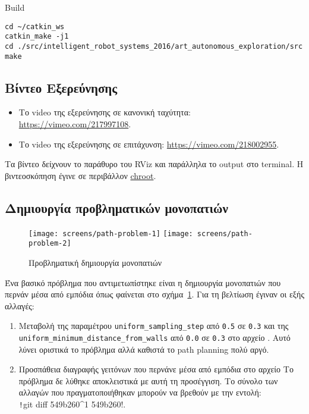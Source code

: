 \begin{code}
\caption{Build}
\begin{verbatim}
cd ~/catkin_ws
catkin_make -j1
cd ./src/intelligent_robot_systems_2016/art_autonomous_exploration/src
make
\end{verbatim}
\end{code}

\subsection{Βίντεο Εξερεύνησης}
\begin{itemize}
    \item Το video της εξερεύνησης σε κανονική ταχύτητα:
          \url{https://vimeo.com/217997108}.
    \item Το video της εξερεύνησης σε επιτάχυνση:
          \url{https://vimeo.com/218002955}.
\end{itemize}
Τα βίντεο δείχνουν το παράθυρο του RViz και παράλληλα το output στο terminal.
Η βιντεοσκόπηση έγινε σε περιβάλλον \hyperref[seq:chroot]{chroot}.

\subsection{Δημιουργία προβληματικών μονοπατιών}\label{section:uniform-sampling}
\begin{figure}[htb]
    \centering
    \texttt{[image: screens/path-problem-1]}
    \texttt{[image: screens/path-problem-2]}
    \caption{Προβληματική δημιουργία μονοπατιών}\label{fig:path-problem}
\end{figure}

Ένα βασικό πρόβλημα που αντιμετωπίστηκε είναι η δημιουργία μονοπατιών που περνάν μέσα από εμπόδια όπως φαίνεται στο σχήμα~\ref{fig:path-problem}.
Για τη βελτίωση έγιναν οι εξής αλλαγές:
\begin{enumerate}
    \item Μεταβολή της παραμέτρου \texttt{uniform\_sampling\_step} από \texttt{0.5} σε \texttt{0.3}
          και της \texttt{uniform\_minimum\_distance\_from\_walls} από \texttt{0.0} σε \texttt{0.3}
          στο αρχείο .
          Αυτό λύνει οριστικά το πρόβλημα αλλά καθιστά το path planning πολύ αργό.

    \item Προσπάθεια διαγραφής γειτόνων που περνάνε μέσα από εμπόδια στο αρχείο
          Το πρόβλημα δε λύθηκε αποκλειστικά με αυτή τη προσέγγιση.
          Το σύνολο των αλλαγών που πραγματοποιήθηκαν μπορούν να βρεθούν με την εντολή:\\
          \texttt!git diff 549b260^1 549b260!.
\end{enumerate}
